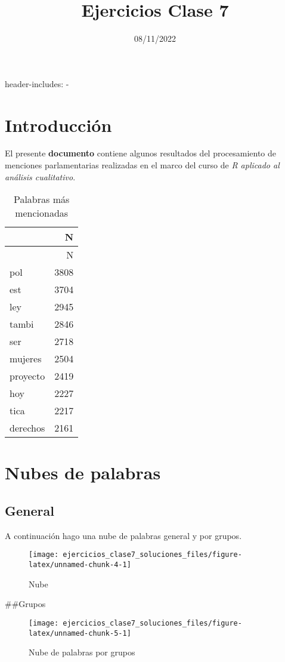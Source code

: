 \documentclass[
]{article}
\title{Ejercicios Clase 7}
\author{}
\date{\vspace{-2.5em}08/11/2022}
\begin{document}
\maketitle

header-includes: -

\usepackage{bbm}

\hypertarget{introducciuxf3n}{%
\section{Introducción}\label{introducciuxf3n}}

El presente \textbf{documento} contiene algunos resultados del
procesamiento de menciones parlamentarias realizadas en el marco del
curso de \emph{R aplicado al análisis cualitativo}.

\begin{longtable}[]{@{}lr@{}}
\caption{Palabras más mencionadas}\tabularnewline
\toprule\noalign{}
& N \\
\midrule\noalign{}
\endfirsthead
\toprule\noalign{}
& N \\
\midrule\noalign{}
\endhead
\bottomrule\noalign{}
\endlastfoot
pol & 3808 \\
est & 3704 \\
ley & 2945 \\
tambi & 2846 \\
ser & 2718 \\
mujeres & 2504 \\
proyecto & 2419 \\
hoy & 2227 \\
tica & 2217 \\
derechos & 2161 \\
\end{longtable}

\newpage

\hypertarget{nubes-de-palabras}{%
\section{Nubes de palabras}\label{nubes-de-palabras}}

\hypertarget{general}{%
\subsection{General}\label{general}}

A continuación hago una nube de palabras general y por grupos.

\begin{figure}
\texttt{[image: ejercicios\_clase7\_soluciones\_files/figure-latex/unnamed-chunk-4-1]} \caption{Nube}\label{fig:unnamed-chunk-4}
\end{figure}

\#\#Grupos

\begin{figure}
\texttt{[image: ejercicios\_clase7\_soluciones\_files/figure-latex/unnamed-chunk-5-1]} \caption{Nube de palabras por grupos}\label{fig:unnamed-chunk-5}
\end{figure}
\end{document}
